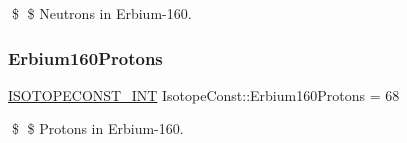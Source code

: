\$ \$ Neutrons in Erbium-\/160. \mbox{\label{group___isotope_const-_erbium-_er160_ga648de51eef9760d1a993723ee6b8b873}} 
\subsubsection{\texorpdfstring{Erbium160\+Protons}{Erbium160Protons}}
{\footnotesize\ttfamily \mbox{\hyperlink{group___isotope_const-_macros_ga5f18360b3e99483a35c32d789e62621c}{I\+S\+O\+T\+O\+P\+E\+C\+O\+N\+S\+T\+\_\+\+I\+NT}} Isotope\+Const\+::\+Erbium160\+Protons = 68}

\$ \$ Protons in Erbium-\/160. 